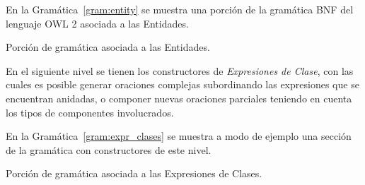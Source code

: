 En la Gramática~\ref{gram:entity} se muestra una porción de la gramática BNF del lenguaje OWL 2 asociada a las Entidades.
\begin{GrammarEnv}
\begin{grammar}
[(colon){$\rightarrow$}]
[(semicolon)$|$]
[(comma){}]
[(period){\vspace{0.3cm} \\}]
[(quote){\begin{bf}}{\end{bf}}]
[(nonterminal){$<$}{$>$}]
\end{grammar}
\caption{Porción de gramática asociada a las Entidades.}\label{gram:entity}
\end{GrammarEnv}

En el siguiente nivel se tienen los constructores de \textit{Expresiones de Clase}, con las cuales es posible generar oraciones complejas subordinando las expresiones que se encuentran anidadas, o componer nuevas oraciones parciales teniendo en cuenta los tipos de componentes involucrados.

En la Gramática~\ref{gram:expr_clases} se muestra a modo de ejemplo una sección de la gramática con constructores de este nivel.
\begin{GrammarEnv}
\begin{grammar}
[(colon){$\rightarrow$}]
[(semicolon)$|$]
[(comma){}]
[(period){\vspace{0.3cm} \\}]
[(quote){\begin{bf}}{\end{bf}}]
[(nonterminal){$<$}{$>$}]
\end{grammar}
\caption{Porción de gramática asociada a las Expresiones de Clases.}\label{gram:expr_clases}
\end{GrammarEnv}

